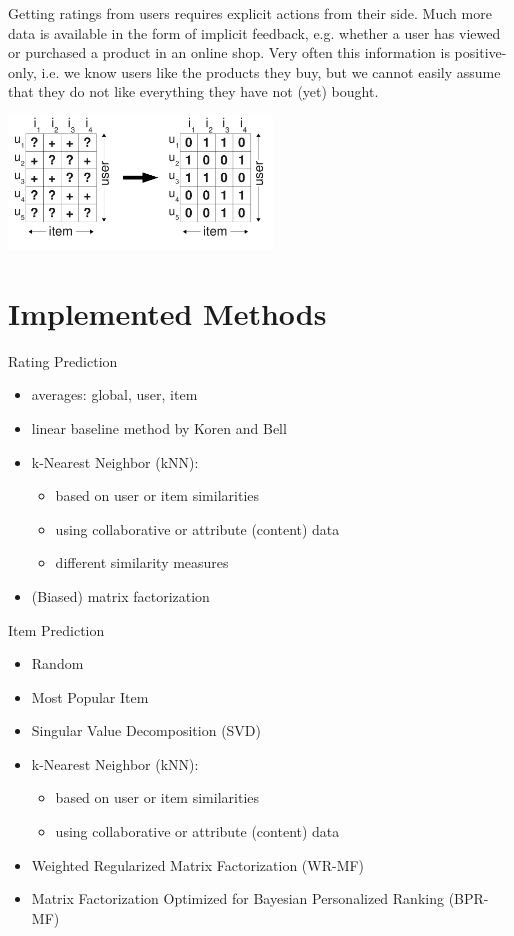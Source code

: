\documentclass[a4paper, foldmark, 12pt]{leaflet}
\begin{document}
Getting ratings from users requires explicit actions from their side.
Much more data is available in the form of implicit feedback,
e.g. whether a user has viewed or purchased a product in an online shop.
Very often this information is positive-only,
i.e. we know users like the products they buy, but we cannot easily assume
that they do not like everything they have not (yet) bought.

\begin{center}
	\includegraphics[width=7.0cm]{fig/interpretation_single.pdf}
\end{center}

\newpage 

\section{Implemented Methods}
Rating Prediction
\begin{itemize}
	\item averages: global, user, item
	\item linear baseline method by Koren and Bell
	\item k-Nearest Neighbor (kNN):
		\begin{itemize}
			\item based on user or item similarities
			\item using collaborative or attribute (content) data
			\item different similarity measures
		\end{itemize}
	\item (Biased) matrix factorization
\end{itemize}

Item Prediction
\begin{itemize}
	\item Random
	\item Most Popular Item
	\item Singular Value Decomposition (SVD)
	\item k-Nearest Neighbor (kNN):
		\begin{itemize}
			\item based on user or item similarities
			\item using collaborative or attribute (content) data
		\end{itemize}
	\item Weighted Regularized Matrix Factorization (WR-MF)
	\item Matrix Factorization Optimized for Bayesian Personalized Ranking (BPR-MF)
\end{itemize}
\end{document}
